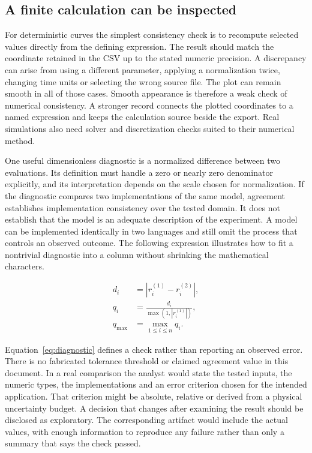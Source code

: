 \subsection{A finite calculation can be inspected}
For deterministic curves the simplest consistency check is to recompute selected values directly from the defining expression. The result should match the coordinate retained in the CSV up to the stated numeric precision. A discrepancy can arise from using a different parameter, applying a normalization twice, changing time units or selecting the wrong source file. The plot can remain smooth in all of those cases. Smooth appearance is therefore a weak check of numerical consistency. A stronger record connects the plotted coordinates to a named expression and keeps the calculation source beside the export. Real simulations also need solver and discretization checks suited to their numerical method.

One useful dimensionless diagnostic is a normalized difference between two evaluations. Its definition must handle a zero or nearly zero denominator explicitly, and its interpretation depends on the scale chosen for normalization. If the diagnostic compares two implementations of the same model, agreement establishes implementation consistency over the tested domain. It does not establish that the model is an adequate description of the experiment. A model can be implemented identically in two languages and still omit the process that controls an observed outcome. The following expression illustrates how to fit a nontrivial diagnostic into a column without shrinking the mathematical characters.

\begin{equation}\begin{aligned}
d_i&=\left|r_i^{(1)}-r_i^{(2)}\right|,\\
q_i&=\frac{d_i}{\max(1,|r_i^{(1)}|)},\\
q_{\max}&=\max_{1\leq i\leq n}q_i.
\end{aligned}\label{eq:diagnostic}\end{equation}

Equation~\eqref{eq:diagnostic} defines a check rather than reporting an observed error. There is no fabricated tolerance threshold or claimed agreement value in this document. In a real comparison the analyst would state the tested inputs, the numeric types, the implementations and an error criterion chosen for the intended application. That criterion might be absolute, relative or derived from a physical uncertainty budget. A decision that changes after examining the result should be disclosed as exploratory. The corresponding artifact would include the actual values, with enough information to reproduce any failure rather than only a summary that says the check passed.

